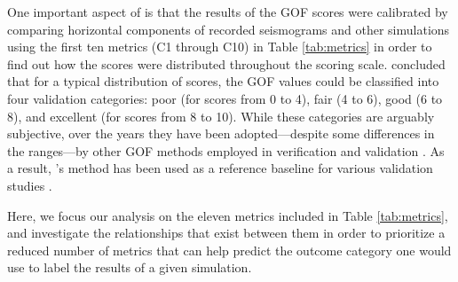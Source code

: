 One important aspect of \citet{Anderson_2004_Proc} is that the results of the GOF scores were calibrated by comparing horizontal components of recorded seismograms and other simulations using the first ten metrics (C1 through C10) in Table \ref{tab:metrics} in order to find out how the scores were distributed throughout the scoring scale. \citeauthor{Anderson_2004_Proc} concluded that for a typical distribution of scores, the GOF values could be classified into four validation categories: poor (for scores from 0 to 4), fair (4 to 6), good (6 to 8), and excellent (for scores from 8 to 10). While these categories are arguably subjective, over the years they have been adopted---despite some differences in the ranges---by other GOF methods employed in verification and validation \citep[e.g.,][]{Kristekova_2009_GJI, Olsen_2010_SRL}. As a result, \citeauthor{Anderson_2004_Proc}'s method has been used as a reference baseline for various validation studies \citep[e.g.,][]{Chaljub_2010_BSSA, Bielak_2010_GJI, Guidotti_2011_SRL, Maufroy_2015_BSSA}.

Here, we focus our analysis on the eleven metrics included in Table \ref{tab:metrics}, and investigate the relationships that exist between them in order to prioritize a reduced number of metrics that can help predict the outcome category one would use to label the results of a given simulation.
